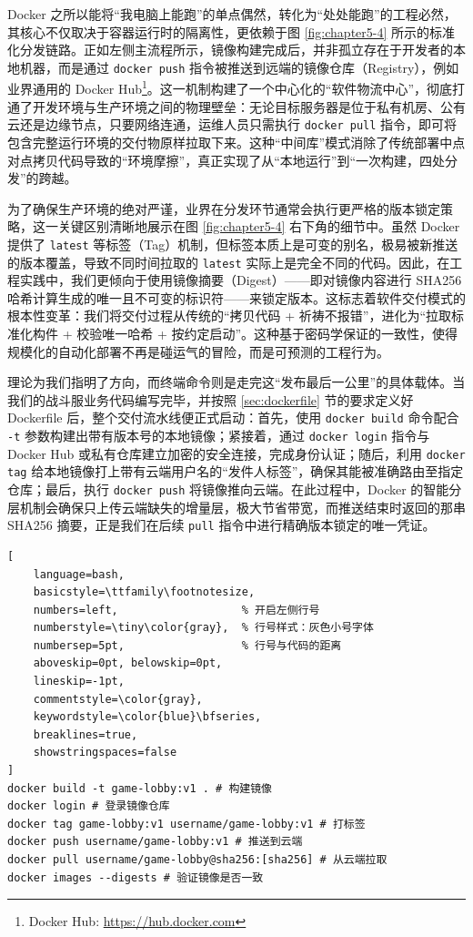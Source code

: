 Docker 之所以能将“我电脑上能跑”的单点偶然，转化为“处处能跑”的工程必然，其核心不仅取决于容器运行时的隔离性，更依赖于图 \ref{fig:chapter5-4} 所示的标准化分发链路。正如左侧主流程所示，镜像构建完成后，并非孤立存在于开发者的本地机器，而是通过 \texttt{docker push} 指令被推送到远端的镜像仓库（Registry），例如业界通用的 Docker Hub\footnote{Docker Hub: \url{https://hub.docker.com}}。这一机制构建了一个中心化的“软件物流中心”，彻底打通了开发环境与生产环境之间的物理壁垒：无论目标服务器是位于私有机房、公有云还是边缘节点，只要网络连通，运维人员只需执行 \texttt{docker pull} 指令，即可将包含完整运行环境的交付物原样拉取下来。这种“中间库”模式消除了传统部署中点对点拷贝代码导致的“环境摩擦”，真正实现了从“本地运行”到“一次构建，四处分发”的跨越。

为了确保生产环境的绝对严谨，业界在分发环节通常会执行更严格的版本锁定策略，这一关键区别清晰地展示在图 \ref{fig:chapter5-4} 右下角的细节中。虽然 Docker 提供了 \texttt{latest} 等标签（Tag）机制，但标签本质上是可变的别名，极易被新推送的版本覆盖，导致不同时间拉取的 \texttt{latest} 实际上是完全不同的代码。因此，在工程实践中，我们更倾向于使用镜像摘要（Digest）——即对镜像内容进行 SHA256 哈希计算生成的唯一且不可变的标识符——来锁定版本。这标志着软件交付模式的根本性变革：我们将交付过程从传统的“拷贝代码 + 祈祷不报错”，进化为“拉取标准化构件 + 校验唯一哈希 + 按约定启动”。这种基于密码学保证的一致性，使得规模化的自动化部署不再是碰运气的冒险，而是可预测的工程行为。

理论为我们指明了方向，而终端命令则是走完这“发布最后一公里”的具体载体。当我们的战斗服业务代码编写完毕，并按照 \ref{sec:dockerfile} 节的要求定义好 Dockerfile 后，整个交付流水线便正式启动：首先，使用 \texttt{docker build} 命令配合 \texttt{-t} 参数构建出带有版本号的本地镜像；紧接着，通过 \texttt{docker login} 指令与 Docker Hub 或私有仓库建立加密的安全连接，完成身份认证；随后，利用 \texttt{docker tag} 给本地镜像打上带有云端用户名的“发件人标签”，确保其能被准确路由至指定仓库；最后，执行 \texttt{docker push} 将镜像推向云端。在此过程中，Docker 的智能分层机制会确保只上传云端缺失的增量层，极大节省带宽，而推送结束时返回的那串 SHA256 摘要，正是我们在后续 \texttt{pull} 指令中进行精确版本锁定的唯一凭证。

\begin{tcolorbox}[title=镜像发布与版本锁定实操]
\begin{lstlisting}[
    language=bash,
    basicstyle=\ttfamily\footnotesize,
    numbers=left,                   % 开启左侧行号
    numberstyle=\tiny\color{gray},  % 行号样式：灰色小号字体
    numbersep=5pt,                  % 行号与代码的距离
    aboveskip=0pt, belowskip=0pt,
    lineskip=-1pt,
    commentstyle=\color{gray},
    keywordstyle=\color{blue}\bfseries,
    breaklines=true,
    showstringspaces=false
]
docker build -t game-lobby:v1 . # 构建镜像
docker login # 登录镜像仓库
docker tag game-lobby:v1 username/game-lobby:v1 # 打标签
docker push username/game-lobby:v1 # 推送到云端
docker pull username/game-lobby@sha256:[sha256] # 从云端拉取
docker images --digests # 验证镜像是否一致 
\end{lstlisting}
\end{tcolorbox}


